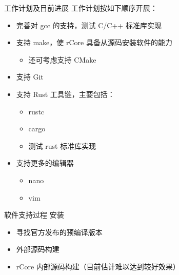 \documentclass{beamer}
\begin{document}
\begin{frame}{工作计划及目前进展}
    工作计划按如下顺序开展：

    \begin{itemize}
        \setlength{\itemsep}{10pt}
        \item 完善对 gcc 的支持，测试 C/C++ 标准库实现
        \item 支持 make，使 rCore 具备从源码安装软件的能力
            \begin{itemize}
                \item 还可考虑支持 CMake
            \end{itemize}
        \item 支持 Git
        \item 支持 Rust 工具链，主要包括：
        \begin{itemize}
            \item rustc
            \item cargo
            \item 测试 rust 标准库实现
        \end{itemize}
        \item 支持更多的编辑器
        \begin{itemize}
            \item nano
            \item vim
        \end{itemize}
    \end{itemize}
\end{frame}

\begin{frame}{软件支持过程}
    {安装}
    \begin{itemize}
        \setlength{\itemsep}{10pt}
        \item 寻找官方发布的预编译版本
        \item 外部源码构建
        \item rCore 内部源码构建（目前估计难以达到较好效果）
    \end{itemize}
\end{frame}
    
\end{document}
